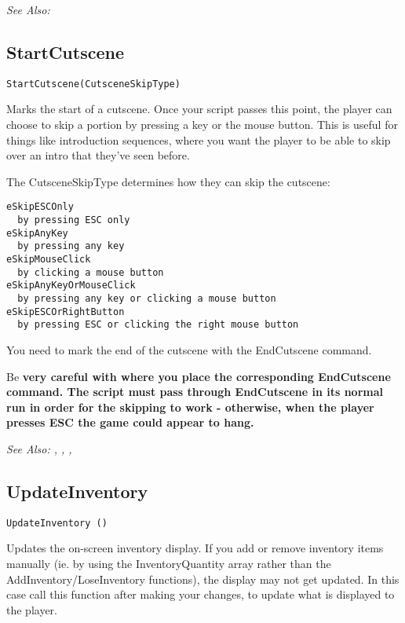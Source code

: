 \it{See Also:} 



\subsection{StartCutscene}\label{StartCutscene}%

\begin{verbatim}
StartCutscene(CutsceneSkipType)
\end{verbatim}

Marks the start of a cutscene. Once your script passes this point, the player can
choose to skip a portion by pressing a key or the mouse button. This is useful for
things like introduction sequences, where you want the player to be able to skip
over an intro that they've seen before.

The CutsceneSkipType determines how they can skip the cutscene:
\begin{verbatim}
eSkipESCOnly
  by pressing ESC only
eSkipAnyKey
  by pressing any key
eSkipMouseClick
  by clicking a mouse button
eSkipAnyKeyOrMouseClick
  by pressing any key or clicking a mouse button
eSkipESCOrRightButton
  by pressing ESC or clicking the right mouse button
\end{verbatim}
You need to mark the end of the cutscene with the EndCutscene command.

Be \bf{very careful} with where you place the corresponding EndCutscene command.
The script \bf{must} pass through EndCutscene in its normal run in order for the skipping
to work - otherwise, when the player presses ESC the game could appear to hang.

\it{See Also:} ,
,
,


\subsection{UpdateInventory}\label{UpdateInventory}%

\begin{verbatim}
UpdateInventory ()
\end{verbatim}
Updates the on-screen inventory display. If you add or remove inventory
items manually (ie. by using the InventoryQuantity array rather than
the AddInventory/LoseInventory functions), the display may not get updated.
In this case call this function after making your changes, to update
what is displayed to the player.

